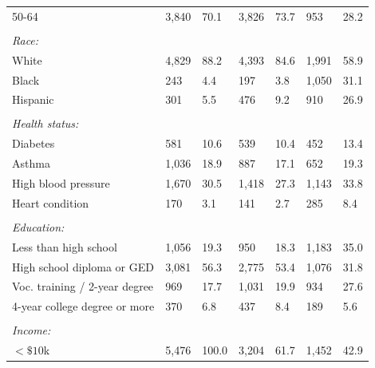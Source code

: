 \documentclass[hidelinks,12pt]{article}
\begin{document}
{\begin{singlespace}
\begin{longtable}{lllllll}
\hspace{3mm}50-64 & 3,840 & 70.1 & 3,826 & 73.7 & 953 & 28.2 \\ 
 &  & & &  &  & \\ 
\textit{Race:} &  & & &  &  & \\ 
\hspace{3mm}White & 4,829 & 88.2 & 4,393 & 84.6 & 1,991 & 58.9  \\ 

\hspace{3mm}Black & 243 & 4.4 & 197 & 3.8 & 1,050 & 31.1  \\ 

\hspace{3mm}Hispanic & 301 & 5.5 & 476 & 9.2 & 910 & 26.9  \\ 
 &  & & &  &  & \\ 
\textit{Health status:} &  & & &  &  & \\ 
\hspace{3mm}Diabetes & 581 & 10.6 & 539 & 10.4 & 452 & 13.4 \\ 

\hspace{3mm}Asthma & 1,036 & 18.9 & 887 & 17.1 & 652 & 19.3  \\ 

\hspace{3mm}High blood pressure & 1,670 & 30.5 & 1,418 & 27.3 & 1,143 & 33.8  \\ 
  
\hspace{3mm}Heart condition & 170 & 3.1 & 141 & 2.7 & 285 & 8.4 \\ 
 &  & & &  &  & \\ 
\textit{Education:} &  & & &  &  & \\  
\hspace{3mm}Less than high school  & 1,056 & 19.3 & 950 & 18.3 & 1,183 & 35.0  \\ 
  
\hspace{3mm}High school diploma or GED & 3,081 & 56.3 & 2,775 & 53.4 & 1,076 & 31.8  \\ 

\hspace{3mm}Voc. training / 2-year degree & 969 & 17.7 & 1,031 & 19.9 & 934 & 27.6 \\ 

\hspace{3mm}4-year college degree or more & 370 & 6.8 & 437 & 8.4 & 189 & 5.6 \\ 
 &  & & &  &  & \\ 
\textit{Income:} &  & & &  &  & \\ 
\hspace{3mm} $<\$10$k & 5,476 & 100.0 & 3,204 & 61.7 & 1,452 & 42.9 \\


\end{longtable}
\end{singlespace}}
\end{document}

